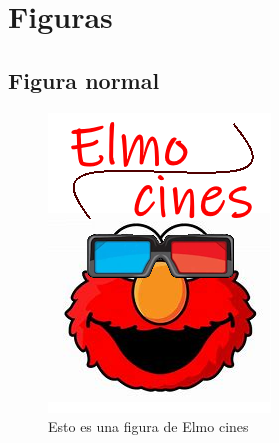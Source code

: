\documentclass{article}
\begin{document}
\section{Figuras}
    \subsection{Figura normal}
        \begin{figure}[ht] %
            \centering
            \includegraphics[scale=0.5]{./ElmoCines.png} %
            \caption{Esto es una figura de Elmo cines}
            \label{fig:Elmo cines}
        \end{figure}
    
\end{document}
